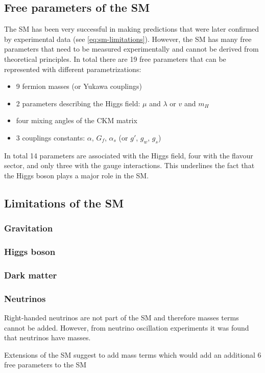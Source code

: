\subsection{Free parameters of the SM}
The SM has been very successful in making predictions that were later confirmed by experimental data (see \cref{eq:sm-limitations}). However, the SM has many free parameters that need to be measured experimentally and cannot be derived from theoretical principles.  
In total there are 19 free parameters that can be represented with different parametrizations:
\begin{itemize}
  \item 9 fermion masses (or Yukawa couplings)
  \item 2 parameters describing the Higgs field: $\mu$ and $\lambda$ or $v$ and $m_H$
  \item four mixing angles of the CKM matrix
  \item 3 couplings constants: $\alpha$, $G_f$, $\alpha_s$ (or $g'$, $g_w$, $g_s$)
\end{itemize}

In total 14 parameters are associated with the Higgs field, four with the flavour sector, and only three with the gauge interactions. This underlines the fact that the Higgs boson plays a major role in the SM.


\subsection{Limitations of the SM}


\subsubsection{Gravitation}

\subsubsection{Higgs boson}

\subsubsection{Dark matter}

\subsubsection{Neutrinos}
Right-handed neutrinos are not part of the SM and therefore masses terms cannot be added. However, from neutrino oscillation experiments it was found that neutrinos have masses.

Extensions of the SM suggest to add mass terms which would add an additional 6 free parameters to the SM





